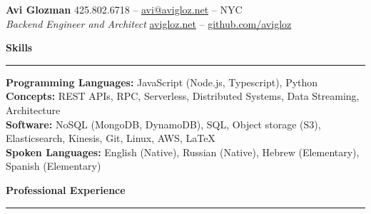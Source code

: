 \documentclass[10pt]{article}
\begin{document}
	\pagestyle{empty}
	\begin{center}
		{\huge \textbf{Avi Glozman}} {\large \hfill 425.802.6718 -- \href{mailto:avi@avigloz.net}{avi@avigloz.net} -- NYC} \\
		{\large \textsl{Backend Engineer and Architect} \hfill \href{https://avigloz.net}{avigloz.net} -- \href{https://github.com/avigloz}{github.com/avigloz}}
	\end{center}
	
	\begin{flushleft}	
		\vspace{-0.5mm}
		{\large \raggedright \textbf{Skills}}
		\vspace{1.25mm}
	
		\hrule
	
		\vspace{2.25mm}
		\textbf{Programming Languages:} JavaScript (Node.js, Typescript), Python \\
		\vspace{0.5mm}
		\textbf{Concepts:} REST APIs, RPC, Serverless, Distributed Systems, Data Streaming, Architecture\\
		\vspace{0.5mm}
		\textbf{Software:} NoSQL (MongoDB, DynamoDB), SQL, Object storage (S3), Elasticsearch, Kinesis, Git, Linux, AWS, \LaTeX\\ 
		\vspace{0.5mm}
		\textbf{Spoken Languages:} English (Native), Russian (Native), Hebrew (Elementary), Spanish (Elementary)

		\vspace{1.5mm}
		{\large \raggedright \textbf{Professional Experience}}
		\vspace{1.25mm}
	
		\hrule

		\vspace{2.25mm}


\end{flushleft}
\end{document}
